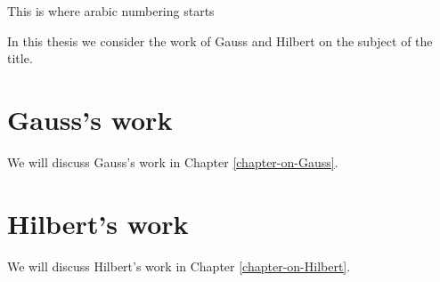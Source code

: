 \noindent %



\noindent This is where arabic numbering starts

In this thesis we consider the work of Gauss \cite{Neumann2005} and
Hilbert \cite{Hilbert1893} on the subject of the title. 




\section*{Gauss's work}

We will discuss Gauss's work in Chapter \ref{chapter-on-Gauss}.




\section*{Hilbert's work}

We will discuss Hilbert's work in Chapter \ref{chapter-on-Hilbert}.
